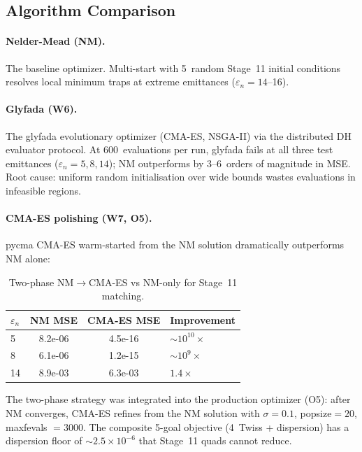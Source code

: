 \documentclass[11pt]{article}
\begin{document}
\subsection{Algorithm Comparison}
\label{sec:algorithms}

\paragraph{Nelder-Mead (NM).}
The baseline optimizer.  Multi-start with 5~random Stage~11 initial
conditions resolves local minimum traps at extreme emittances
($\varepsilon_n = 14$--16).

\paragraph{Glyfada (W6).}
The glyfada evolutionary optimizer (CMA-ES, NSGA-II) via the distributed
DH evaluator protocol.  At 600~evaluations per run, glyfada fails at all
three test emittances ($\varepsilon_n = 5, 8, 14$); NM outperforms by
3--6~orders of magnitude in MSE.  Root cause: uniform random
initialisation over wide bounds wastes evaluations in infeasible regions.

\paragraph{CMA-ES polishing (W7, O5).}
pycma CMA-ES warm-started from the NM solution dramatically outperforms
NM alone:

\begin{table}[ht]
\centering
\caption{Two-phase NM$\to$CMA-ES vs NM-only for Stage~11 matching.}
\label{tab:cmaes}
\begin{tabular}{@{} l S[scientific-notation=true] S[scientific-notation=true] l @{}}
\toprule
$\varepsilon_n$ & {NM MSE} & {CMA-ES MSE} & Improvement \\
   & 8.2e-06 & 4.5e-16 & $\sim 10^{10}\times$ \\
8   & 6.1e-06 & 1.2e-15 & $\sim 10^{9}\times$ \\
14  & 8.9e-03 & 6.3e-03 & $1.4\times$ \\
\bottomrule
\end{tabular}
\end{table}

The two-phase strategy was integrated into the production optimizer
(O5): after NM converges, CMA-ES refines from the NM solution with
$\sigma = 0.1$, popsize$= 20$, maxfevals $= 3000$.  The composite
5-goal objective (4~Twiss + dispersion) has a dispersion floor of
$\sim 2.5 \times 10^{-6}$ that Stage~11 quads cannot reduce.
\end{document}
